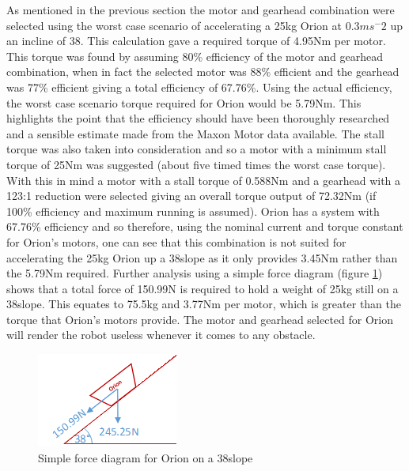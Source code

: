 As mentioned in the previous section the motor and gearhead combination were selected using the worst case scenario of accelerating a 25kg Orion at 0.3$ms^-2$ up an incline of 38\textordmasculine. This calculation gave a required torque of 4.95Nm per motor. This torque was found by assuming 80\% efficiency of the motor and gearhead combination, when in fact the selected motor was 88\% efficient and the gearhead was 77\% efficient giving a total efficiency of 67.76\%. Using the actual efficiency, the worst case scenario torque required for Orion would be 5.79Nm. This highlights the point that the efficiency should have been thoroughly researched and a sensible estimate made from the Maxon Motor data available. The stall torque was also taken into consideration and so a motor with a minimum stall torque of 25Nm was suggested (about five timed times the worst case torque). With this in mind a motor with a stall torque of 0.588Nm and a gearhead with a 123:1 reduction were selected giving an overall torque output of 72.32Nm (if 100\% efficiency and maximum running is assumed). Orion has a system with 67.76\% efficiency and so therefore, using the nominal current and torque constant for Orion’s motors, one can see that this combination is not suited for accelerating the 25kg Orion up a 38\textordmasculine slope as it only provides 3.45Nm rather than the 5.79Nm required. Further analysis using a simple force diagram (figure \ref{fig:slopeforce}) shows that a total force of 150.99N is required to hold a weight of 25kg still on a 38\textordmasculine slope. This equates to 75.5kg and 3.77Nm per motor, which is greater than the torque that Orion’s motors provide. The motor and gearhead selected for Orion will render the robot useless whenever it comes to any obstacle.\par

\begin{figure}[h]
\centering\includegraphics[width=0.4\linewidth]{Images/DT_Fig_4.png}
\caption{Simple force diagram for Orion on a 38\textordmasculine slope}
\label{fig:slopeforce}
\end{figure}

